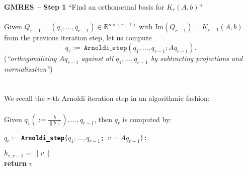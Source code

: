 \begin{frame}
	\textbf{GMRES -- Step 1 }
``Find an orthonormal basis for $K_r(A,b)$''\\~\\
		Given $Q_{r-1}=(q_1,\dots,q_{r-1})\in\mathbb{R}^{n\times (r-1)}$ with Im$(Q_{r-1})=K_{r-1}(A,b)$ from the previous iteration step, let us compute
		$$
		q_r :=~\texttt{Arnoldi\_step}(q_1,\dots,q_{r-1};Aq_{r-1}).
		$$
(\textit{``orthogonalizing $Aq_{r-1}$ against all $q_1,\dots,q_{r-1}$ by subtracting projections and normalization''})
~\\~\\~\\
We recall the $r$-th Arnoldi iteration step in an algorithmic fashion:\\~\\

			Given $q_1(:=\frac{b}{\|b\|}),\dots,q_{r-1}$, then $q_r$ is computed by:

\begin{center}
				$q_r:=$\texttt{{\large \bf Arnoldi\_step}($q_1,\dots,q_{r-1}$; $v=Aq_{r-1}$):}\\[0.2cm]
			\hspace*{6cm}\begin{minipage}{0.8\textwidth}
								$h_{r,r-1}=\|v\|$\\
		\textbf{return} $v$ 
			
			\end{minipage}
\end{center}
\end{frame}


